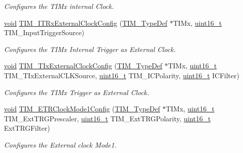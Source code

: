 \begin{DoxyCompactItemize}
\begin{DoxyCompactList}\small\item\em Configures the T\+I\+Mx internal Clock. \end{DoxyCompactList}\item 
\hyperlink{usb__devapi_8h_afabf60e7f57651d6d595a02c75f07cd0}{void} \hyperlink{group___t_i_m___exported___functions_gabef227d21d9e121e6a4ec5ab6223f5a9}{T\+I\+M\+\_\+\+I\+T\+Rx\+External\+Clock\+Config} (\hyperlink{struct_t_i_m___type_def}{T\+I\+M\+\_\+\+Type\+Def} $\ast$T\+I\+Mx, \hyperlink{_p_e___types_8h_a1f1825b69244eb3ad2c7165ddc99c956}{uint16\+\_\+t} T\+I\+M\+\_\+\+Input\+Trigger\+Source)
\begin{DoxyCompactList}\small\item\em Configures the T\+I\+Mx Internal Trigger as External Clock. \end{DoxyCompactList}\item 
\hyperlink{usb__devapi_8h_afabf60e7f57651d6d595a02c75f07cd0}{void} \hyperlink{group___t_i_m___exported___functions_gaf460e7d9c9969044e364130e209937fc}{T\+I\+M\+\_\+\+T\+Ix\+External\+Clock\+Config} (\hyperlink{struct_t_i_m___type_def}{T\+I\+M\+\_\+\+Type\+Def} $\ast$T\+I\+Mx, \hyperlink{_p_e___types_8h_a1f1825b69244eb3ad2c7165ddc99c956}{uint16\+\_\+t} T\+I\+M\+\_\+\+T\+Ix\+External\+C\+L\+K\+Source, \hyperlink{_p_e___types_8h_a1f1825b69244eb3ad2c7165ddc99c956}{uint16\+\_\+t} T\+I\+M\+\_\+\+I\+C\+Polarity, \hyperlink{_p_e___types_8h_a1f1825b69244eb3ad2c7165ddc99c956}{uint16\+\_\+t} I\+C\+Filter)
\begin{DoxyCompactList}\small\item\em Configures the T\+I\+Mx Trigger as External Clock. \end{DoxyCompactList}\item 
\hyperlink{usb__devapi_8h_afabf60e7f57651d6d595a02c75f07cd0}{void} \hyperlink{group___t_i_m___exported___functions_ga47c05638b93aabcd641dbc8859e1b2df}{T\+I\+M\+\_\+\+E\+T\+R\+Clock\+Mode1\+Config} (\hyperlink{struct_t_i_m___type_def}{T\+I\+M\+\_\+\+Type\+Def} $\ast$T\+I\+Mx, \hyperlink{_p_e___types_8h_a1f1825b69244eb3ad2c7165ddc99c956}{uint16\+\_\+t} T\+I\+M\+\_\+\+Ext\+T\+R\+G\+Prescaler, \hyperlink{_p_e___types_8h_a1f1825b69244eb3ad2c7165ddc99c956}{uint16\+\_\+t} T\+I\+M\+\_\+\+Ext\+T\+R\+G\+Polarity, \hyperlink{_p_e___types_8h_a1f1825b69244eb3ad2c7165ddc99c956}{uint16\+\_\+t} Ext\+T\+R\+G\+Filter)
\begin{DoxyCompactList}\small\item\em Configures the External clock Mode1. \end{DoxyCompactList}\item 

\end{DoxyCompactItemize}
